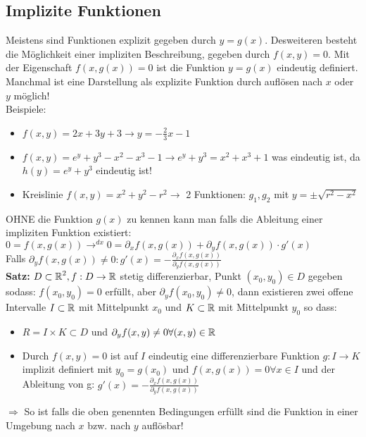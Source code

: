 \documentclass[german]{latex4ei/latex4ei_sheet}
\begin{document}
\subsection{Implizite Funktionen}
Meistens sind Funktionen explizit gegeben durch $y=g(x)$. Desweiteren besteht die M\"oglichkeit einer impliziten Beschreibung, gegeben durch $f(x,y)=0$. Mit der Eigenschaft $f(x,g(x))=0$ ist die Funktion $y=g(x)$ eindeutig definiert. Manchmal ist eine Darstellung als explizite Funktion durch aufl\"osen nach $x$ oder $y$ m\"oglich!\\
Beispiele:\\
\begin{itemize}
\item $f(x,y)=2x+3y+3 \rightarrow y=-\frac{2}{3}x-1$
\item $f(x,y)=e^y+y^3-x^2-x^3-1 \rightarrow e^y+y^3=x^2+x^3+1$ was eindeutig ist, da $h(y)=e^y+y^3$ eindeutig ist!
\item Kreislinie $f(x,y)=x^2+y^2-r^2 \rightarrow$ 2 Funktionen: $g_1,g_2$ mit $y=\pm \sqrt{r^2-x^2}$\\
\end{itemize}
OHNE die Funktion $g(x)$ zu kennen kann man
falls die Ableitung einer impliziten Funktion existiert:\\
$0=f(x,g(x)) \rightarrow^{d x} 0=\partial_x f(x,g(x))+\partial_y f(x,g(x)) \cdot g'(x)$\\
Falls $\partial_y f(x,g(x))\neq 0: g'(x)=-\frac{\partial_x f(x,g(x))}{\partial_y f(x,g(x))}$\\ 
\textbf{Satz:} $D \subset \operatorname{\mathbb R}^2, f: D \to \operatorname{\mathbb R}$ stetig differenzierbar, Punkt $(x_0,y_0) \in D$ gegeben sodass: $f(x_0,y_0)=0$ erf\"ullt, aber $\partial_y f(x_0,y_0)\neq 0$, dann existieren zwei offene Intervalle $I \subset \operatorname{\mathbb R}$ mit Mittelpunkt $x_0$ und $K \subset \operatorname{\mathbb R}$ mit Mittelpunkt $y_0$ so dass:\\
\begin{itemize}
\item $R=I \times K \subset D$ und $\partial_y f(x,y)\neq 0 \forall (x,y) \in \operatorname{\mathbb R}$
\item Durch $f(x,y)=0$ ist auf $I$ eindeutig eine differenzierbare Funktion $g:I \to K$ implizit definiert mit $y_0=g(x_0)$ und $f(x,g(x))=0 \forall x \in I$ und der Ableitung von g: $g'(x)=-\frac{\partial_x f(x,g(x))}{\partial_y f(x,g(x))}$
\end{itemize}
$\Rightarrow$ So ist falls die oben genennten Bedingungen erf\"ullt sind die Funktion in einer Umgebung nach $x$ bzw. nach $y$ aufl\"osbar!\\
\end{document}
